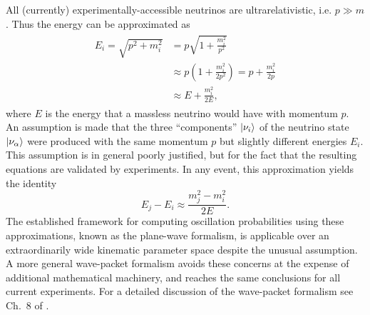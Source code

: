 All (currently) experimentally-accessible neutrinos are ultrarelativistic,
i.e. $p \gg m$.
Thus the energy can be approximated as
\begin{align}\label{eq:energy_approx}
    \begin{split}
        E_i = \sqrt{p^2 + m_i^2}
        &= p\sqrt{1 + \frac{m_i^2}{p^2}} \\
        &\approx p\left(1 + \frac{m_i^2}{2p^2}\right) = p + \frac{m_i^2}{2p} \\
        &\approx E + \frac{m_i^2}{2E},
    \end{split}
\end{align}
where $E$ is the energy that a massless neutrino would have with momentum $p$.
An assumption is made that the three ``components'' $\ket{\nu_i}$
of the neutrino state $\ket{\nu_\alpha}$
were produced with the same momentum $p$ but slightly different energies $E_i$.
This assumption is in general poorly justified,
but for the fact that the resulting equations are validated by experiments.
In any event, this approximation yields the identity
\begin{equation}\label{eq:msq_approx}
    E_j - E_i \approx \frac{m_j^2 - m_i^2}{2E}.
\end{equation}
The established framework for computing oscillation probabilities
using these approximations, known as the plane-wave formalism,
is applicable over an extraordinarily wide
kinematic parameter space despite the unusual assumption.
A more general wave-packet formalism avoids these concerns
at the expense of additional mathematical machinery,
and reaches the same conclusions for all current experiments.
For a detailed discussion of the wave-packet formalism see
Ch.~8 of \cite{neutrino_textbook}.

